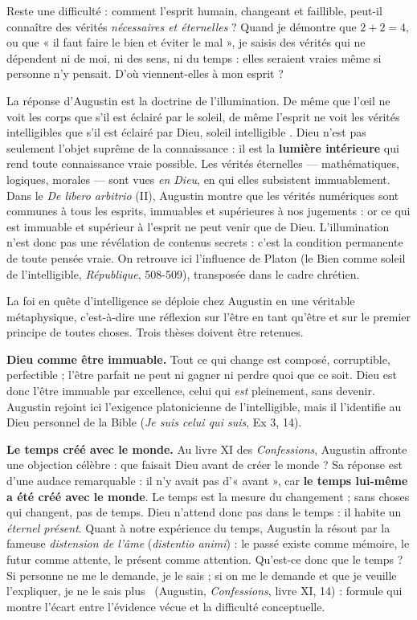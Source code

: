 \documentclass[11pt]{article}
\newcommand{\cle}[1]{{\popxbold\color{popdark}#1}}
\newcounter{popsec}
\newcounter{popsub}
\newcommand{\courssub}[1]{%
  \stepcounter{popsub}%
  \par\vspace{9pt}\noindent{\popxbold\fontsize{11.5}{13}\selectfont\color{popink}{\color{poporange}\thepopsec.\thepopsub}\hspace{6pt}#1}\par\nopagebreak\vspace{4pt}
}
\begin{document}
Reste une difficulté : comment l'esprit humain, changeant et faillible, peut-il connaître des vérités \emph{nécessaires et éternelles} ? Quand je démontre que $2 + 2 = 4$, ou que « il faut faire le bien et éviter le mal », je saisis des vérités qui ne dépendent ni de moi, ni des sens, ni du temps : elles seraient vraies même si personne n'y pensait. D'où viennent-elles à mon esprit ?

La réponse d'Augustin est la doctrine de l'\cle{illumination}. De même que l'œil ne voit les corps que s'il est éclairé par le soleil, de même l'esprit ne voit les vérités intelligibles que s'il est éclairé par Dieu, \guillemotleft soleil intelligible \guillemotright. Dieu n'est pas seulement l'objet suprême de la connaissance : il est la \textbf{lumière intérieure} qui rend toute connaissance vraie possible. Les vérités éternelles — mathématiques, logiques, morales — sont vues \emph{en Dieu}, en qui elles subsistent immuablement. Dans le \emph{De libero arbitrio} (II), Augustin montre que les vérités numériques sont communes à tous les esprits, immuables et supérieures à nos jugements : or ce qui est immuable et supérieur à l'esprit ne peut venir que de Dieu. L'illumination n'est donc pas une révélation de contenus secrets : c'est la condition permanente de toute pensée vraie. On retrouve ici l'influence de Platon (le Bien comme soleil de l'intelligible, \emph{République}, 508-509), transposée dans le cadre chrétien.

\courssub{Dieu, le temps, l'éternité et le problème du mal}

La foi en quête d'intelligence se déploie chez Augustin en une véritable \cle{métaphysique}, c'est-à-dire une réflexion sur l'être en tant qu'être et sur le premier principe de toutes choses. Trois thèses doivent être retenues.

\textbf{Dieu comme être immuable.} Tout ce qui change est composé, corruptible, perfectible ; l'être parfait ne peut ni gagner ni perdre quoi que ce soit. Dieu est donc l'être immuable par excellence, celui qui \emph{est} pleinement, sans devenir. Augustin rejoint ici l'exigence platonicienne de l'intelligible, mais il l'identifie au Dieu personnel de la Bible (\emph{Je suis celui qui suis}, Ex 3, 14).

\textbf{Le temps créé avec le monde.} Au livre XI des \emph{Confessions}, Augustin affronte une objection célèbre : que faisait Dieu avant de créer le monde ? Sa réponse est d'une audace remarquable : il n'y avait pas d'« avant », car \textbf{le temps lui-même a été créé avec le monde}. Le temps est la mesure du changement ; sans choses qui changent, pas de temps. Dieu n'attend donc pas dans le temps : il habite un \emph{éternel présent}. Quant à notre expérience du temps, Augustin la résout par la fameuse \emph{distension de l'âme} (\emph{distentio animi}) : le passé existe comme mémoire, le futur comme attente, le présent comme attention. \guillemotleft Qu'est-ce donc que le temps ? Si personne ne me le demande, je le sais ; si on me le demande et que je veuille l'expliquer, je ne le sais plus \guillemotright\ (Augustin, \emph{Confessions}, livre XI, 14) : formule qui montre l'écart entre l'évidence vécue et la difficulté conceptuelle.
\end{document}
